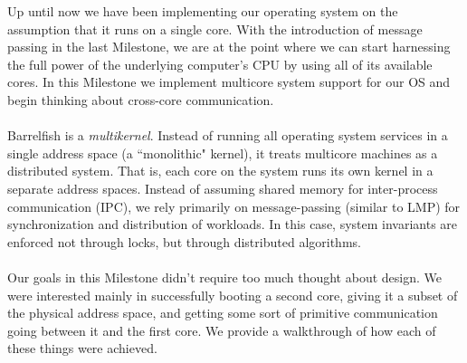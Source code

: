 Up until now we have been implementing our operating system on the assumption that it runs on a single core. With the introduction of message passing in the last Milestone, we are at the point where we can start harnessing the full power of the underlying computer's CPU by using all of its available cores. In this Milestone we implement multicore system support for our OS and begin thinking about cross-core communication.
\\\\
Barrelfish is a \textit{multikernel}. Instead of running all operating system services in a single address space (a ``monolithic" kernel), it treats multicore machines as a distributed system. That is, each core on the system runs its own kernel in a separate address spaces. Instead of assuming shared memory for inter-process communication (IPC), we rely primarily on message-passing (similar to LMP) for synchronization and distribution of workloads. In this case, system invariants are enforced not through locks, but through distributed algorithms.
\\\\
Our goals in this Milestone didn't require too much thought about design. We were interested mainly in successfully booting a second core, giving it a subset of the physical address space, and getting some sort of primitive communication going between it and the first core. We provide a walkthrough of how each of these things were achieved.

